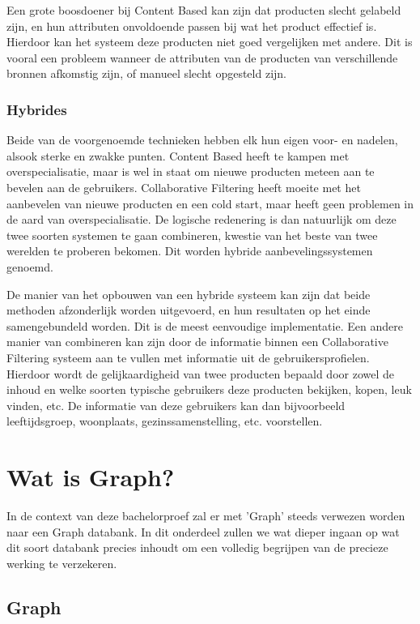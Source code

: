 Een grote boosdoener bij Content Based kan zijn dat producten slecht gelabeld zijn, en hun attributen onvoldoende passen bij wat het product effectief is. Hierdoor kan het systeem deze producten niet goed vergelijken met andere. Dit is vooral een probleem wanneer de attributen van de producten van verschillende bronnen afkomstig zijn, of manueel slecht opgesteld zijn.

\subsubsection{Hybrides}
\label{sec:Hybrides}

Beide van de voorgenoemde technieken hebben elk hun eigen voor- en nadelen, alsook sterke en zwakke punten. Content Based heeft te kampen met overspecialisatie, maar is wel in staat om nieuwe producten meteen aan te bevelen aan de gebruikers. Collaborative Filtering heeft moeite met het aanbevelen van nieuwe producten en een cold start, maar heeft geen problemen in de aard van overspecialisatie.
De logische redenering is dan natuurlijk om deze twee soorten systemen te gaan combineren, kwestie van het beste van twee werelden te proberen bekomen. Dit worden hybride aanbevelingssystemen \autocite{Cano2017} genoemd.

De manier van het opbouwen van een hybride systeem kan zijn dat beide methoden afzonderlijk worden uitgevoerd, en hun resultaten op het einde samengebundeld worden. Dit is de meest eenvoudige implementatie.
Een andere manier van combineren kan zijn door de informatie binnen een Collaborative Filtering systeem aan te vullen met informatie uit de gebruikersprofielen. Hierdoor wordt de gelijkaardigheid van twee producten bepaald door zowel de inhoud en welke soorten typische gebruikers deze producten bekijken, kopen, leuk vinden, etc.
De informatie van deze gebruikers kan dan bijvoorbeeld leeftijdsgroep, woonplaats, gezinssamenstelling, etc. voorstellen.


\section{Wat is Graph?}
\label{sec:wat is Graph?}

In de context van deze bachelorproef zal er met 'Graph' steeds verwezen worden naar een Graph databank. In dit onderdeel zullen we wat dieper ingaan op wat dit soort databank precies inhoudt om een volledig begrijpen van de precieze werking te verzekeren. 

\subsection{Graph}
\label{sec:Graph}


